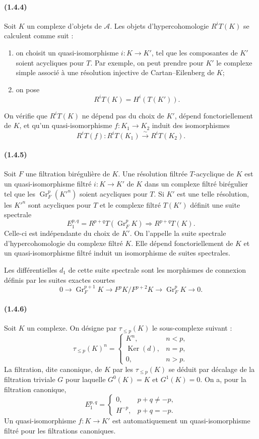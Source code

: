 \documentclass[10pt]{article}
\newcommand{\Gr}{\operatorname{Gr}}
\newcommand{\Ker}{\operatorname{Ker}}
\newcommand{\calA}{\mathcal A}
\newcommand{\iso}{\xrightarrow{\sim}}
\begin{document}
\paragraph{(1.4.4)} Soit $K$ un complexe d'objets de $\calA$. Les objets d'hypercohomologie $R^iT(K)$ se calculent comme suit :
\begin{enumerate}[label=\alph*)]
\item on choisit un quasi-isomorphisme $i:K\to K'$, tel que les composantes de $K'$ soient acycliques pour $T$. Par exemple, on peut prendre pour $K'$ le complexe simple associé à une résolution injective de Cartan--Eilenberg de $K$;
\item on pose
\[
R^iT(K)=H^i(T(K')).
\]
\end{enumerate}
On vérifie que $R^iT(K)$ ne dépend pas du choix de $K'$, dépend fonctoriellement de $K$, et qu'un quasi-isomorphisme $f:K_1\to K_2$ induit des isomorphismes
\[
R^iT(f):R^iT(K_1)\iso R^iT(K_2).
\]

\paragraph{(1.4.5)} Soit $F$ une filtration birégulière de $K$. Une résolution filtrée $T$-acyclique de $K$ est un quasi-isomorphisme filtré $i:K\to K'$ de $K$ dans un complexe filtré birégulier tel que les $\Gr_F^p(K'^n)$ soient acycliques pour $T$. Si $K'$ est une telle résolution, les $K'^n$ sont acycliques pour $T$ et le complexe filtré $T(K')$ définit une suite spectrale
\[
E_1^{p,q}=R^{p+q}T(\Gr_F^pK)\Rightarrow R^{p+q}T(K).
\]
Celle-ci est indépendante du choix de $K'$. On l'appelle la suite spectrale d'hypercohomologie du complexe filtré $K$. Elle dépend fonctoriellement de $K$ et un quasi-isomorphisme filtré induit un isomorphisme de suites spectrales.

Les différentielles $d_1$ de cette suite spectrale sont les morphismes de connexion définis par les suites exactes courtes
\[
0\to\Gr_F^{p+1}K\to F^pK/F^{p+2}K\to\Gr_F^pK\to0.
\]

\paragraph{(1.4.6)} Soit $K$ un complexe. On désigne par $\tau_{\le p}(K)$ le sous-complexe suivant :
\[
\tau_{\le p}(K)^n=\begin{cases}
K^n,& n<p,\\
\Ker(d),& n=p,\\
0,& n>p.
\end{cases}
\]
La filtration, dite canonique, de $K$ par les $\tau_{\le p}(K)$ se déduit par décalage de la filtration triviale $G$ pour laquelle $G^0(K)=K$ et $G^1(K)=0$. On a, pour la filtration canonique,
\[
E_1^{p,q}=\begin{cases}
0,& p+q\ne -p,\\
H^{-p},& p+q=-p.
\end{cases}
\]
Un quasi-isomorphisme $f:K\to K'$ est automatiquement un quasi-isomorphisme filtré pour les filtrations canoniques.
\end{document}
